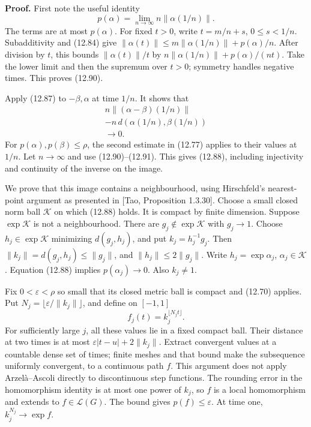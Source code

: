 \documentclass[
  11pt,
]{article}
\begin{document}
\textbf{Proof.} First note the useful identity \[
p(\alpha)=\lim_{n\to\infty}
                     n\|\alpha(1/n)\|.
\tag{12.90}
\] The terms are at most \(p(\alpha)\). For fixed \(t>0\), write
\(t=m/n+s\), \(0\leq s<1/n\). Subadditivity and (12.84) give
\(\|\alpha(t)\|\leq m\|\alpha(1/n)\|+p(\alpha)/n\). After division by
\(t\), this bounds \(\|\alpha(t)\|/t\) by
\(n\|\alpha(1/n)\|+p(\alpha)/(nt)\). Take the lower limit and then the
supremum over \(t>0\); symmetry handles negative times. This proves
(12.90).

Apply (12.87) to \(-\beta,\alpha\) at time \(1/n\). It shows that \[
\begin{gathered}
n\|(\alpha-\beta)(1/n)\|\\
-n\,d(\alpha(1/n),\beta(1/n))\\
\longrightarrow0.
\end{gathered}
\tag{12.91}
\] For \(p(\alpha),p(\beta)\leq\rho\), the second estimate in (12.77)
applies to their values at \(1/n\). Let \(n\to\infty\) and use
(12.90)--(12.91). This gives (12.88), including injectivity and
continuity of the inverse on the image.

We prove that this image contains a neighbourhood, using Hirschfeld's
nearest-point argument as presented in {[}Tao, Proposition 1.3.30{]}.
Choose a small closed norm ball \(\mathcal K\) on which (12.88) holds.
It is compact by finite dimension. Suppose \(\exp\mathcal K\) is not a
neighbourhood. There are \(g_j\notin\exp\mathcal K\) with \(g_j\to1\).
Choose \(h_j\in\exp\mathcal K\) minimizing \(d(g_j,h_j)\), and put
\(k_j=h_j^{-1}g_j\). Then \(\|k_j\|=d(g_j,h_j)\leq\|g_j\|\), and
\(\|h_j\|\leq2\|g_j\|\). Write \(h_j=\exp\alpha_j\),
\(\alpha_j\in\mathcal K\). Equation (12.88) implies \(p(\alpha_j)\to0\).
Also \(k_j\ne1\).

Fix \(0<\varepsilon<\rho\) so small that its closed metric ball is
compact and (12.70) applies. Put
\(N_j=\lfloor\varepsilon/\|k_j\|\rfloor\), and define on \([-1,1]\) \[
f_j(t)=k_j^{\lfloor N_jt\rfloor}.
\tag{12.92}
\] For sufficiently large \(j\), all these values lie in a fixed compact
ball. Their distance at two times is at most
\(\varepsilon|t-u|+2\|k_j\|\). Extract convergent values at a countable
dense set of times; finite meshes and that bound make the subsequence
uniformly convergent, to a continuous path \(f\). This argument does not
apply Arzelà--Ascoli directly to discontinuous step functions. The
rounding error in the homomorphism identity is at most one power of
\(k_j\), so \(f\) is a local homomorphism and extends to
\(f\in\mathcal L(G)\). The bound gives \(p(f)\leq\varepsilon\). At time
one, \(k_j^{N_j}\to\exp f\).
\end{document}
